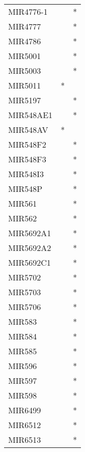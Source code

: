 \begin{longtable}{lcc}
MIR4776-1       &                &          * \\
MIR4777         &                &          * \\
MIR4786         &                &          * \\
MIR5001         &                &          * \\
MIR5003         &                &          * \\
MIR5011         &              * &            \\
MIR5197         &                &          * \\
MIR548AE1       &                &          * \\
MIR548AV        &              * &            \\
MIR548F2        &                &          * \\
MIR548F3        &                &          * \\
MIR548I3        &                &          * \\
MIR548P         &                &          * \\
MIR561          &                &          * \\
MIR562          &                &          * \\
MIR5692A1       &                &          * \\
MIR5692A2       &                &          * \\
MIR5692C1       &                &          * \\
MIR5702         &                &          * \\
MIR5703         &                &          * \\
MIR5706         &                &          * \\
MIR583          &                &          * \\
MIR584          &                &          * \\
MIR585          &                &          * \\
MIR596          &                &          * \\
MIR597          &                &          * \\
MIR598          &                &          * \\
MIR6499         &                &          * \\
MIR6512         &                &          * \\
MIR6513         &                &          * \\

\end{longtable}
